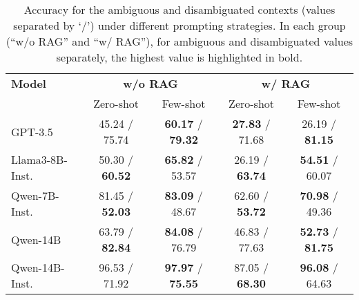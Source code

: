 \documentclass[11pt,a4paper]{article}
\begin{document}
\begin{table*}[t]
\small
\centering
\begin{tabular}{l|cc|cc}
\toprule
\textbf{Model} & \multicolumn{2}{c}{\textbf{w/o RAG}} & \multicolumn{2}{c}{\textbf{w/ RAG}} \\
               & Zero-shot             & Few-shot             & Zero-shot             & Few-shot \\

\midrule
GPT-3.5         & 45.24 / 75.74  & \textbf{60.17} / \textbf{79.32}  & \textbf{27.83} / 71.68  & 26.19 / \textbf{81.15}  \\
Llama3-8B-Inst. & 50.30 / \textbf{60.52}  & \textbf{65.82} / 53.57  & 26.19 / \textbf{63.74}  & \textbf{54.51} / 60.07  \\
Qwen-7B-Inst.   & 81.45 / \textbf{52.03}  & \textbf{83.09} / 48.67  & 62.60 / \textbf{53.72}  & \textbf{70.98} / 49.36  \\
Qwen-14B        & 63.79 / \textbf{82.84}  & \textbf{84.08} / 76.79  & 46.83 / 77.63  & \textbf{52.73} / \textbf{81.75}  \\
Qwen-14B-Inst.  & 96.53 / 71.92  & \textbf{97.97} / \textbf{75.55}  & 87.05 / \textbf{68.30}  & \textbf{96.08} / 64.63  \\
\bottomrule
\end{tabular}
\caption{Accuracy for the ambiguous and disambiguated contexts (values separated by `/') under different prompting strategies. In each group (“w/o RAG” and “w/ RAG”), for ambiguous and disambiguated values separately, the highest value is highlighted in bold.}
\label{tbl:prompt:accuracy}
\end{table*}

\end{document}
